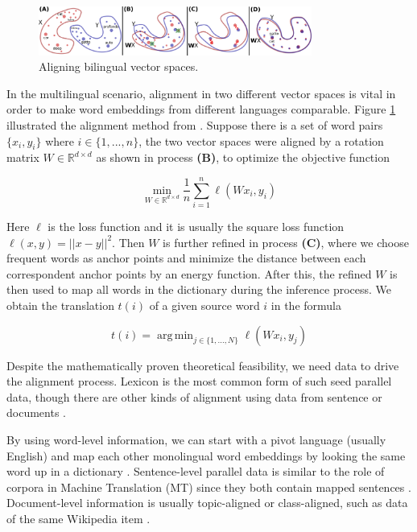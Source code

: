 \documentclass[thesis,fonts=libertine]{cluu}
\DeclareMathOperator*{\argmin}{arg\,min}
\begin{document}
\begin{figure}
  \centering
  \includegraphics[width=0.8\textwidth]{vector_spaces_alignment.png}
  \caption{Aligning bilingual vector spaces. \parencite{Conneau:2017aa}}
  \label{fig:vec_space_align}
\end{figure}

In the multilingual scenario, alignment in two different vector spaces is vital in order to make word embeddings from different languages comparable. Figure \ref{fig:vec_space_align} illustrated the alignment method from \textcite{Conneau:2017aa}. Suppose there is a set of word pairs $\{x_i, y_i\}$ where ${i\in \{1, ..., n\}}$, the two vector spaces were aligned by a rotation matrix $W \in \mathbb{R}^{d \times d}$ as shown in process \textbf{(B)}, to optimize the objective function 

\begin{equation*}
  \min_{W \in \mathbb{R}^{d \times d}} \frac{1}{n}\sum_{i=1}^n \ell(Wx_i, y_i)
\end{equation*}

\noindent Here $\ell$ is the loss function and it is usually the square loss function $\ell(x, y)=||x-y||^2$. Then $W$ is further refined in process \textbf{(C)}, where we choose frequent words as anchor points and minimize the distance between each correspondent anchor points by an energy function. After this, the refined $W$ is then used to map all words in the dictionary during the inference process. We obtain the translation $t(i)$ of a given source word $i$ in the formula

\begin{equation*}
  t(i) = \argmin_{j\in \{1, ..., N\}} \ell(Wx_i, y_j)
\end{equation*}

Despite the mathematically proven theoretical feasibility, we need data to drive the alignment process. Lexicon is the most common form of such seed parallel data, though there are other kinds of alignment using data from sentence or documents \parencite{Ruder:2019aa}.

By using word-level information, we can start with a pivot language (usually English) and map each other monolingual word embeddings by looking the same word up in a dictionary \parencite{Mikolov:2013ac}. Sentence-level parallel data is similar to the role of corpora in Machine Translation (MT) since they both contain mapped sentences \parencite{Hermann:2013aa}. Document-level information is usually topic-aligned or class-aligned, such as data of the same Wikipedia item \parencite{vulic-moens-2013-study}.
\end{document}

